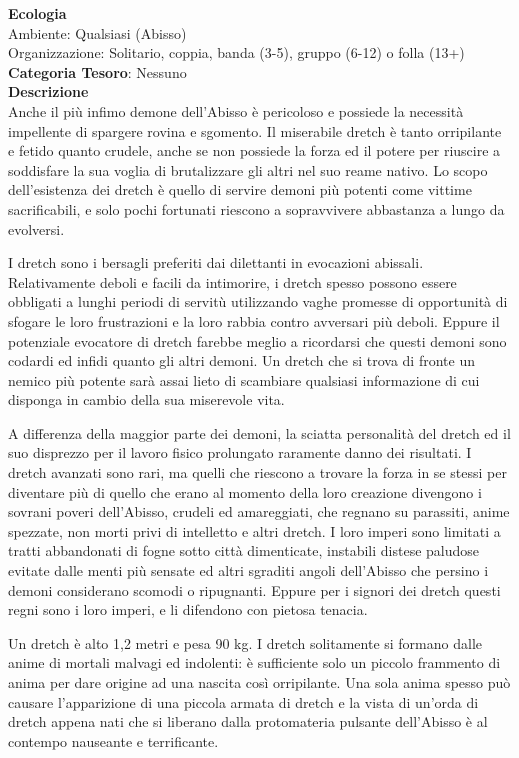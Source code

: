 \begin{multicols}{2}
{\textbf{Ecologia}\\
Ambiente: Qualsiasi (Abisso)\\
Organizzazione: Solitario, coppia, banda (3-5), gruppo (6-12) o folla (13+)\\
\textbf{Categoria Tesoro}: Nessuno\\
\textbf{Descrizione}\\
Anche il più infimo demone dell'Abisso è pericoloso e possiede la necessità impellente di spargere rovina e sgomento. Il miserabile dretch è tanto orripilante e fetido quanto crudele, anche se non possiede la forza ed il potere per riuscire a soddisfare la sua voglia di brutalizzare gli altri nel suo reame nativo. Lo scopo dell'esistenza dei dretch è quello di servire demoni più potenti come vittime sacrificabili, e solo pochi fortunati riescono a sopravvivere abbastanza a lungo da evolversi.

I dretch sono i bersagli preferiti dai dilettanti in evocazioni abissali. Relativamente deboli e facili da intimorire, i dretch spesso possono essere obbligati a lunghi periodi di servitù utilizzando vaghe promesse di opportunità di sfogare le loro frustrazioni e la loro rabbia contro avversari più deboli. Eppure il potenziale evocatore di dretch farebbe meglio a ricordarsi che questi demoni sono codardi ed infidi quanto gli altri demoni. Un dretch che si trova di fronte un nemico più potente sarà assai lieto di scambiare qualsiasi informazione di cui disponga in cambio della sua miserevole vita.

A differenza della maggior parte dei demoni, la sciatta personalità del dretch ed il suo disprezzo per il lavoro fisico prolungato raramente danno dei risultati. I dretch avanzati sono rari, ma quelli che riescono a trovare la forza in se stessi per diventare più di quello che erano al momento della loro creazione divengono i sovrani poveri dell'Abisso, crudeli ed amareggiati, che regnano su parassiti, anime spezzate, non morti privi di intelletto e altri dretch. I loro imperi sono limitati a tratti abbandonati di fogne sotto città dimenticate, instabili distese paludose evitate dalle menti più sensate ed altri sgraditi angoli dell'Abisso che persino i demoni considerano scomodi o ripugnanti. Eppure per i signori dei dretch questi regni sono i loro imperi, e li difendono con pietosa tenacia.

Un dretch è alto 1,2 metri e pesa 90 kg. I dretch solitamente si formano dalle anime di mortali malvagi ed indolenti: è sufficiente solo un piccolo frammento di anima per dare origine ad una nascita così orripilante. Una sola anima spesso può causare l'apparizione di una piccola armata di dretch e la vista di un'orda di dretch appena nati che si liberano dalla protomateria pulsante dell'Abisso è al contempo nauseante e terrificante.


}
\end{multicols}

